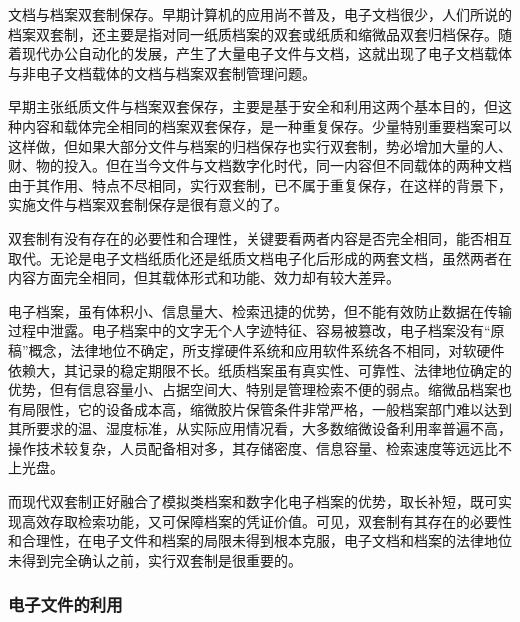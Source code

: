 \begin{enumerate.zh}
    \item 文档与档案双套制保存。早期计算机的应用尚不普及，电子文档很少，人们所说的档案双套制，还主要是指对同一纸质档案的双套或纸质和缩微品双套归档保存。随着现代办公自动化的发展，产生了大量电子文件与文档，这就出现了电子文档载体与非电子文档载体的文档与档案双套制管理问题。

    早期主张纸质文件与档案双套保存，主要是基于安全和利用这两个基本目的，但这种内容和载体完全相同的档案双套保存，是一种重复保存。少量特别重要档案可以这样做，但如果大部分文件与档案的归档保存也实行双套制，势必增加大量的人、财、物的投入。但在当今文件与文档数字化时代，同一内容但不同载体的两种文档由于其作用、特点不尽相同，实行双套制，已不属于重复保存，在这样的背景下，实施文件与档案双套制保存是很有意义的了。

    双套制有没有存在的必要性和合理性，关键要看两者内容是否完全相同，能否相互取代。无论是电子文档纸质化还是纸质文档电子化后形成的两套文档，虽然两者在内容方面完全相同，但其载体形式和功能、效力却有较大差异。

    电子档案，虽有体积小、信息量大、检索迅捷的优势，但不能有效防止数据在传输过程中泄露。电子档案中的文字无个人字迹特征、容易被篡改，电子档案没有“原稿”概念，法律地位不确定，所支撑硬件系统和应用软件系统各不相同，对软硬件依赖大，其记录的稳定期限不长。纸质档案虽有真实性、可靠性、法律地位确定的优势，但有信息容量小、占据空间大、特别是管理检索不便的弱点。缩微品档案也有局限性，它的设备成本高，缩微胶片保管条件非常严格，一般档案部门难以达到其所要求的温、湿度标准，从实际应用情况看，大多数缩微设备利用率普遍不高，操作技术较复杂，人员配备相对多，其存储密度、信息容量、检索速度等远远比不上光盘。

    而现代双套制正好融合了模拟类档案和数字化电子档案的优势，取长补短，既可实现高效存取检索功能，又可保障档案的凭证价值。可见，双套制有其存在的必要性和合理性，在电子文件和档案的局限未得到根本克服，电子文档和档案的法律地位未得到完全确认之前，实行双套制是很重要的。

    \end{enumerate.zh}

\subsubsection {电子文件的利用}

